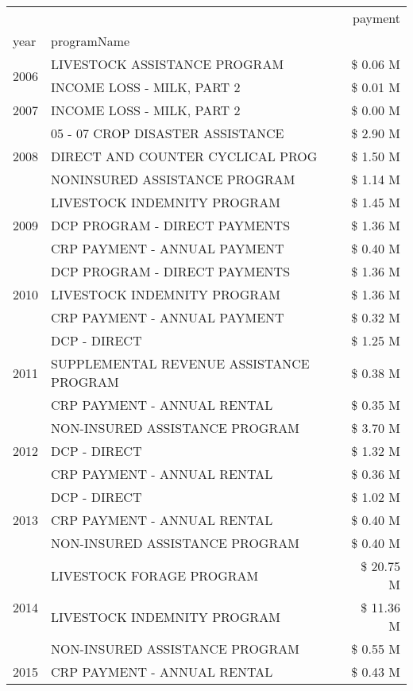 \begin{tabular}{llr}
\toprule
 &  & payment \\
year & programName &  \\
\midrule
\multirow[t]{2}{*}{2006} & LIVESTOCK ASSISTANCE PROGRAM & \$ 0.06 M \\
 & INCOME LOSS - MILK, PART 2 & \$ 0.01 M \\
\cline{1-3}
2007 & INCOME LOSS - MILK, PART 2 & \$ 0.00 M \\
\cline{1-3}
\multirow[t]{3}{*}{2008} & 05 - 07 CROP DISASTER ASSISTANCE & \$ 2.90 M \\
 & DIRECT AND COUNTER CYCLICAL PROG & \$ 1.50 M \\
 & NONINSURED ASSISTANCE PROGRAM & \$ 1.14 M \\
\cline{1-3}
\multirow[t]{3}{*}{2009} & LIVESTOCK INDEMNITY PROGRAM & \$ 1.45 M \\
 & DCP PROGRAM - DIRECT PAYMENTS & \$ 1.36 M \\
 & CRP PAYMENT - ANNUAL PAYMENT & \$ 0.40 M \\
\cline{1-3}
\multirow[t]{3}{*}{2010} & DCP PROGRAM - DIRECT PAYMENTS & \$ 1.36 M \\
 & LIVESTOCK INDEMNITY PROGRAM & \$ 1.36 M \\
 & CRP PAYMENT - ANNUAL PAYMENT & \$ 0.32 M \\
\cline{1-3}
\multirow[t]{3}{*}{2011} & DCP - DIRECT & \$ 1.25 M \\
 & SUPPLEMENTAL REVENUE ASSISTANCE PROGRAM & \$ 0.38 M \\
 & CRP PAYMENT - ANNUAL RENTAL & \$ 0.35 M \\
\cline{1-3}
\multirow[t]{3}{*}{2012} & NON-INSURED ASSISTANCE PROGRAM & \$ 3.70 M \\
 & DCP - DIRECT & \$ 1.32 M \\
 & CRP PAYMENT - ANNUAL RENTAL & \$ 0.36 M \\
\cline{1-3}
\multirow[t]{3}{*}{2013} & DCP - DIRECT & \$ 1.02 M \\
 & CRP PAYMENT - ANNUAL RENTAL & \$ 0.40 M \\
 & NON-INSURED ASSISTANCE PROGRAM & \$ 0.40 M \\
\cline{1-3}
\multirow[t]{3}{*}{2014} & LIVESTOCK FORAGE PROGRAM & \$ 20.75 M \\
 & LIVESTOCK INDEMNITY PROGRAM & \$ 11.36 M \\
 & NON-INSURED ASSISTANCE PROGRAM & \$ 0.55 M \\
\cline{1-3}
\multirow[t]{3}{*}{2015} & CRP PAYMENT - ANNUAL RENTAL & \$ 0.43 M \\

\end{tabular}
